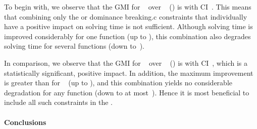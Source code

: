 To begin with, we observe that the \gls{GMI} for ~ over ~
() is \printGMI{%
  \SolvTechEnableOnlyGoodDomConsPrePlusSolvingTimeSpeedupPrePlusSolvingTimeRegularSpeedupGmean%
} with \gls{CI}~\printGMICI{%
  \SolvTechEnableOnlyGoodDomConsPrePlusSolvingTimeSpeedupPrePlusSolvingTimeRegularSpeedupCiMin%
}{%
  \SolvTechEnableOnlyGoodDomConsPrePlusSolvingTimeSpeedupPrePlusSolvingTimeRegularSpeedupCiMax%
}.
%
This means that combining only the  or
\gls{dominance breaking.c} \glspl{constraint} that individually have a positive
impact on solving time is not sufficient.
%
Although solving time is improved considerably for one \gls{function} (up to
\printSpeedup{%
  \SolvTechEnableOnlyGoodDomConsPrePlusSolvingTimeSpeedupPrePlusSolvingTimeZeroCenteredSpeedupMax%
}), this combination also degrades solving time for several \glspl{function}
(down
to~\printSpeedup{%
  \SolvTechEnableOnlyGoodDomConsPrePlusSolvingTimeSpeedupPrePlusSolvingTimeZeroCenteredSpeedupMin%
}).

In comparison, we observe that the \gls{GMI} for ~ over ~ ()
is \printGMI{%
  \SolvTechDisableAllDomConsPrePlusSolvingTimeSpeedupPrePlusSolvingTimeRegularSpeedupGmean%
} with \gls{CI}~\printGMICI{%
  \SolvTechDisableAllDomConsPrePlusSolvingTimeSpeedupPrePlusSolvingTimeRegularSpeedupCiMin%
}{%
  \SolvTechDisableAllDomConsPrePlusSolvingTimeSpeedupPrePlusSolvingTimeRegularSpeedupCiMax%
}, which is a statistically significant, positive impact.
%
In addition, the maximum improvement is greater than for ~ (up to
\printSpeedup{%
  \SolvTechDisableAllDomConsPrePlusSolvingTimeSpeedupPrePlusSolvingTimeZeroCenteredSpeedupMax%
}), and this combination yields no considerable degradation for any
\gls{function} (down to at
most~\printSpeedup{%
  \SolvTechDisableAllDomConsPrePlusSolvingTimeSpeedupPrePlusSolvingTimeZeroCenteredSpeedupMin%
}).
%
Hence it is most beneficial to include all such \glspl{constraint} in the
.


\paragraph{Conclusions}

